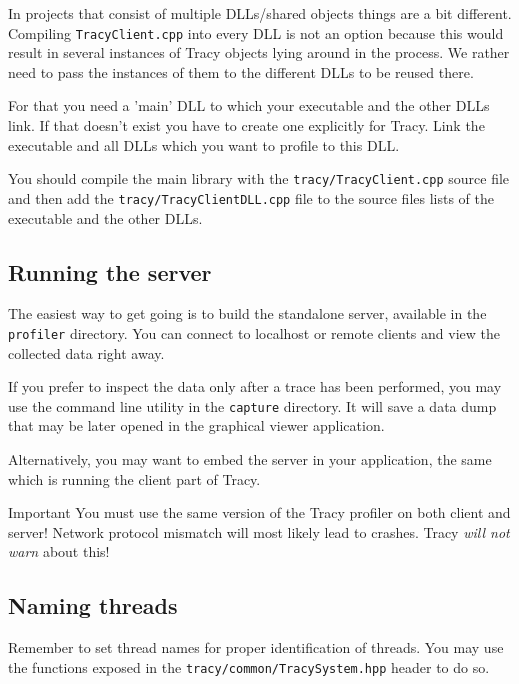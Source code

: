 \documentclass[hidelinks,titlepage,a4paper]{article}
\begin{document}
In projects that consist of multiple DLLs/shared objects things are a bit different. Compiling \texttt{TracyClient.cpp} into every DLL is not an option because this would result in several instances of Tracy objects lying around in the process. We rather need to pass the instances of them to the different DLLs to be reused there.

For that you need a 'main' DLL to which your executable and the other DLLs link. If that doesn't exist you have to create one explicitly for Tracy. Link the executable and all DLLs which you want to profile to this DLL.

You should compile the main library with the \texttt{tracy/TracyClient.cpp} source file and then add the \texttt{tracy/TracyClientDLL.cpp} file to the source files lists of the executable and the other DLLs.

\subsection{Running the server}

The easiest way to get going is to build the standalone server, available in the \texttt{profiler} directory. You can connect to localhost or remote clients and view the collected data right away.

If you prefer to inspect the data only after a trace has been performed, you may use the command line utility in the \texttt{capture} directory. It will save a data dump that may be later opened in the graphical viewer application.

Alternatively, you may want to embed the server in your application, the same which is running the client part of Tracy.

\begin{bclogo}[
noborder=true,
couleur=black!5,
logo=\bcbombe
]{Important}
You must use the same version of the Tracy profiler on both client and server! Network protocol mismatch will most likely lead to crashes. Tracy \emph{will not warn} about this!
\end{bclogo}

\subsection{Naming threads}

Remember to set thread names for proper identification of threads. You may use the functions exposed in the \texttt{tracy/common/TracySystem.hpp} header to do so.
\end{document}
